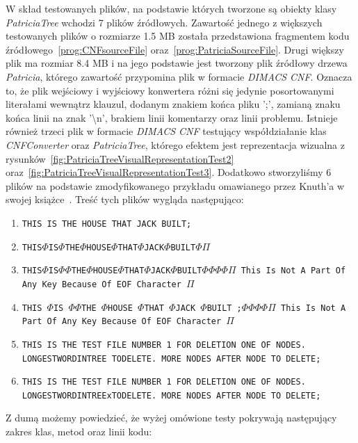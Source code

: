 		W skład testowanych plików, na podstawie których tworzone są obiekty klasy \emph{PatriciaTree} wchodzi 7 plików źródłowych. Zawartość jednego z większych testowanych plików o rozmiarze 1.5 MB została przedstawiona fragmentem kodu źródłowego~\ref{prog:CNFsourceFile} oraz~\ref{prog:PatriciaSourceFile}. Drugi większy plik ma rozmiar 8.4 MB i na jego podstawie jest tworzony plik źródłowy drzewa \emph{Patricia}, którego zawartość przypomina plik w formacie \emph{DIMACS CNF}. Oznacza to, że plik wejściowy i wyjściowy konwertera różni się jedynie posortowanymi literałami wewnątrz klauzul, dodanym znakiem końca pliku ';', zamianą znaku końca linii na znak '\textbackslash n', brakiem linii komentarzy oraz linii problemu. Istnieje również trzeci plik w formacie \emph{DIMACS CNF} testujący współdziałanie klas \emph{CNFConverter} oraz \emph{PatriciaTree}, którego efektem jest reprezentacja wizualna z rysunków~\ref{fig:PatriciaTreeVisualRepresentationTest2} oraz~\ref{fig:PatriciaTreeVisualRepresentationTest3}. Dodatkowo stworzyliśmy 6 plików na podstawie zmodyfikowanego przykładu omawianego przez Knuth'a w swojej książce~\cite{KnuthsTheArtOfComputerProgramming3}. Treść tych plików wygląda następująco:
		\begin{enumerate}
		    \item \texttt{THIS IS THE HOUSE THAT JACK BUILT;}
		    \item \texttt{THIS$\Phi$IS$\Phi$THE$\Phi$HOUSE$\Phi$THAT$\Phi$JACK$\Phi$BUILT$\Phi\Pi$}
		    \item \texttt{THIS$\Phi$IS$\Phi\Phi$THE$\Phi$HOUSE$\Phi$THAT$\Phi$JACK$\Phi$BUILT$\Phi\Phi\Phi\Phi\Pi$ This Is Not A Part Of Any Key Because Of EOF Character $\Pi$}
		    \item \texttt{THIS $\Phi$IS $\Phi\Phi$THE $\Phi$HOUSE $\Phi$THAT $\Phi$JACK $\Phi$BUILT ;$\Phi\Phi\Phi\Phi\Pi$ This Is Not A Part Of Any Key Because Of EOF Character $\Pi$}
		    \item \texttt{THIS IS THE TEST FILE NUMBER 1 FOR DELETION ONE OF NODES. LONGESTWORDINTREE TODELETE. MORE NODES AFTER NODE TO DELETE;}
		    \item \texttt{THIS IS THE TEST FILE NUMBER 1 FOR DELETION ONE OF NODES. LONGESTWORDINTREExTODELETE. MORE NODES AFTER NODE TO DELETE;}
		\end{enumerate}
        
        Z dumą możemy powiedzieć, że wyżej omówione testy pokrywają następujący zakres klas, metod oraz linii kodu:
    
